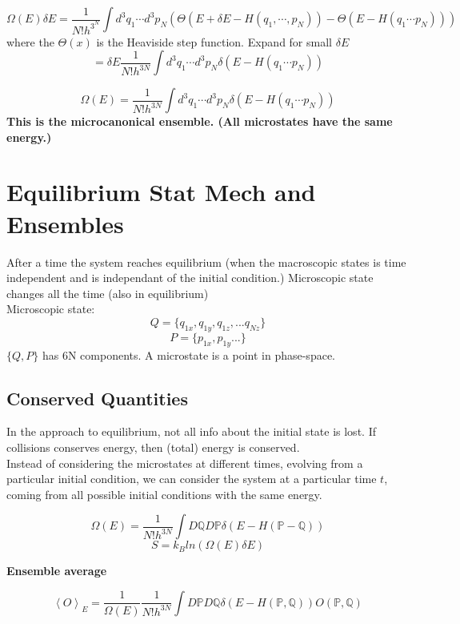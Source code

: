 \documentclass[11pt]{book}
\theoremstyle{definition}
\begin{document}
\begin{equation}
	\Omega(E)\delta E = \frac{1}{N!h^{3^{N}}} \int d^3 q_1 \cdots d^3 p_N (\Theta(E+\delta E -H(q_1, \cdots, p_N) ) -\Theta (E-H(q_1 \cdots p_N))) 
\end{equation}
where the $ \Theta (x) $ is the Heaviside step function.
Expand for small $ \delta E $ 
\[ = \delta E \frac{1}{N!h^{3N}} \int d^3 q_1 \cdots d^3 p_N \delta (E- H(q_1 \cdots p_N)) \] 

\begin{shaded*}
\begin{equation}
	\Omega(E) = \frac{1}{N!h^{3N}} \int d^3 q_1 \cdots d^3 p_N \delta (E- H(q_1 \cdots p_N)) 
\end{equation}
\textbf{This is the microcanonical ensemble. (All microstates have the same energy.)} 
\end{shaded*}

\section{Equilibrium Stat Mech and Ensembles}
After a time the system reaches equilibrium (when the macroscopic states is time independent and is independant of the initial condition.)
Microscopic state changes all the time (also in equilibrium) \\
Microscopic state: 
$$ Q = \{q_{1x}, q_{1y}, q_{1z}, ... q_{Nz}\} $$
\[ P = \{p_{1x}, p_{1y} ...\}\] 
$ \{Q,P\} $ has 6N components.
A microstate is a point in phase-space.
\subsection{Conserved Quantities}
In the approach to equilibrium, not all info about the initial state is lost. If collisions conserves energy, then (total) energy is conserved. \\
Instead of considering the microstates at different times, evolving from a particular initial condition, we can consider the system at a particular time $ t $, coming from all possible initial conditions with the same energy.

\[ \Omega(E) = \frac{1}{N!h^{3N}} \int D\mathbb{Q} D\mathbb{P} \delta(E - H(\mathbb{P} - \mathbb{Q}))\] 
\begin{equation}
	S = k_B ln(\Omega(E)\delta E)
\end{equation}

\textbf{Ensemble average}

\[ \left \langle   O \right \rangle_E = \frac{1}{\Omega(E)} \frac{1}{N!h^{3N}}\int D\mathbb{P} D \mathbb{Q} \delta(E-H(\mathbb{P},\mathbb{Q}))O(\mathbb{P},\mathbb{Q})\] 
\pagebreak
\end{document}
